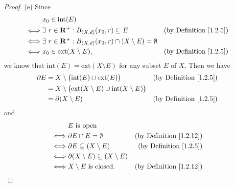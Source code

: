 \begin{proof}{(e)}
    Since
    \begin{align*}
             & x_0 \in \text{int}(E)                                                                                                  \\
        \iff & \exists\ r \in \mathbf{R}^+ : B_{(X, d)}(x_0, r) \subseteq E                      & \text{(by Definition \ref{1.2.5})} \\
        \iff & \exists\ r \in \mathbf{R}^+ : B_{(X, d)}(x_0, r) \cap (X \setminus E) = \emptyset                                      \\
        \iff & x_0 \in \text{ext}(X \setminus E),                                                & \text{(by Definition \ref{1.2.5})}
    \end{align*}
    we know that \(\text{int}(E) = \text{ext}(X \setminus E)\) for any subset \(E\) of \(X\).
    Then we have
    \begin{align*}
        \partial E & = X \setminus \big(\text{int}(E) \cup \text{ext}(E)\big)                         & \text{(by Definition \ref{1.2.5})} \\
                   & = X \setminus \big(\text{ext}(X \setminus E) \cup \text{int}(X \setminus E)\big)                                      \\
                   & = \partial (X \setminus E)                                                       & \text{(by Definition \ref{1.2.5})}
    \end{align*}
    and
    \begin{align*}
             & E \text{ is open}                                                                        \\
        \iff & \partial E \cap E = \emptyset                      & \text{(by Definition \ref{1.2.12})} \\
        \iff & \partial E \subseteq (X \setminus E)               & \text{(by Definition \ref{1.2.5})}  \\
        \iff & \partial (X \setminus E) \subseteq (X \setminus E)                                       \\
        \iff & X \setminus E \text{ is closed}.                   & \text{(by Definition \ref{1.2.12})}
    \end{align*}
\end{proof}

